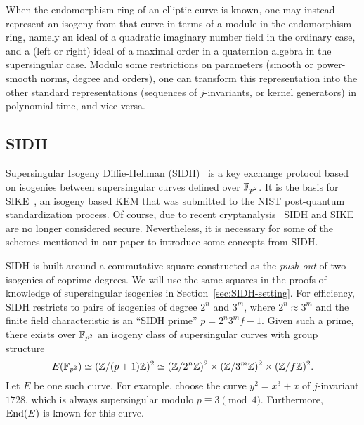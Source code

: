 When the endomorphism ring of an elliptic curve is known, one may instead represent an isogeny from that curve in terms of a module in the endomorphism ring, namely an ideal of a quadratic imaginary number field in the ordinary case, and a (left or right) ideal of a maximal order in a quaternion algebra in the supersingular case.
%
Modulo some restrictions on parameters (smooth or power-smooth norms, degree and orders), one can transform this representation into the other standard representations (sequences of $j$-invariants, or kernel generators) in polynomial-time, and vice versa.







\subsection{SIDH}\label{sec:SIDH}

Supersingular Isogeny Diffie-Hellman (SIDH)~\cite{JDF11,DFJP14} is a key exchange protocol based on isogenies between supersingular curves defined over $\mathbb{F}_{p^2}$.
It is the basis for SIKE~\cite{sike2017}, an isogeny based KEM that was submitted to the NIST post-quantum standardization process.
Of course, due to recent cryptanalysis~\cite{CD22,MM22,Rob22} SIDH and SIKE are no longer considered secure.
Nevertheless, it is necessary for some of the schemes mentioned in our paper to introduce some concepts from SIDH.

SIDH is built around a commutative square constructed as the \emph{push-out} of two isogenies of coprime degrees.
We will use the same squares in the proofs of knowledge of supersingular isogenies in Section~\ref{sec:SIDH-setting}.
For efficiency, SIDH restricts to pairs of isogenies of degree $2^{n}$ and $3^{m}$, where $2^{n} \approx 3^{m}$ and the finite field characteristic is an ``SIDH prime'' $p = 2^{n}  3^{m} f - 1 $.
%
Given such a prime, there exists over $\mathbb{F}_{p^2}$ an isogeny class of supersingular curves with group structure
\[
   E(\mathbb{F}_{p^2}) \simeq (\mathbb{Z} /(p + 1)\mathbb{Z})^2 \simeq (\mathbb{Z} /2^n\mathbb{Z})^2 \times (\mathbb{Z} / 3^m \mathbb{Z})^2 \times (\mathbb{Z} / f \mathbb{Z})^2.
\]
Let $E$ be one such curve. For example, choose the curve $y^2 = x^3 + x$ of $j$-invariant $1728$, which is always supersingular modulo  $p \equiv 3 \pmod{4}$. Furthermore, $\text{End}(E)$ is known for this curve.

